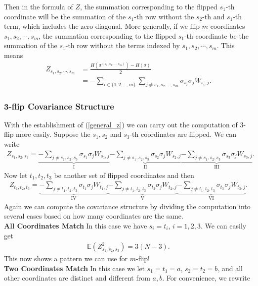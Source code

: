 \documentclass[10pt]{article}
\newcommand{\e}{\mathbb{E}}
\newenvironment{Proof of lemma}{\noindent{\bf Proof of Lemma}}{\hfill$\Box$\newline}
\newenvironment{Proof of claim}{\noindent{\bf Proof of claim}}{\hfill$\Box$\newline}
\newenvironment{Proof of theorem}{\noindent{\bf Proof of Theorem}}{\hfill\scriptsize{$\Box$}\newline}
\newenvironment{Proof of theorems}{\noindent{\bf Proof of Theorems}}{\hfill$\Box$\newline}
\newenvironment{Proof of proposition}{\noindent{\bf Proof of Proposition}}{\hfill$\Box$\newline}
\newenvironment{Proof of propositions}{\noindent{\bf Proof of Propositions}}{\hfill$\Box$\newline}
\newenvironment{Proof of exercise}{\noindent{\it Proof of Exercise:}}{\hfill$\Box$}
\numberwithin{equation}{section}
\begin{document}
Then in the formula of $Z$, the summation corresponding to the flipped $s_1$-th coordinate will be the summation of the $s_1$-th row without the $s_2$-th and $s_1$-th term, which includes the zero diagonal. More generally, if we flip $m$ coordinates ${s_1,s_2,\cdots,s_m}$, the summation corresponding to the flipped $s_1$-th coordinate be the summation of the $s_1$-th row without the terms indexed by ${s_1,s_2,\cdots,s_m}$. This means
\begin{align} \label{general_z}
    Z_{s_1,s_2,\cdots,s_m} &= \frac{H(\sigma^{(s_1,s_2,\cdots,s_m)})-H(\sigma)}{2} \nonumber \\
    &= -\sum_{i \in \{1,2,\cdots,m\}} \sum_{j \neq s_1,s_2,\cdots,s_m} \sigma_{s_i} \sigma_j W_{s_i,j}.
\end{align}
\subsubsection{3-flip Covariance Structure}
With the establishment of (\ref{general_z}) we can carry out the computation of 3-flip more easily. Suppose the $s_1,s_2$ and $s_3$-th coordinates are flipped. We can write
\begin{align}
    Z_{s_1,s_2,s_3} = \underbrace{- \sum_{j \neq s_1,s_2,s_3} \sigma_{s_1} \sigma_j W_{s_1,j}}_\text{I} \underbrace{- \sum_{j \neq s_1,s_2,s_3} \sigma_{s_2} \sigma_j W_{s_2,j}}_\text{II} \underbrace{- \sum_{j \neq s_1,s_2,s_3} \sigma_{s_3} \sigma_j W_{s_3,j}}_\text{III}.
\end{align}
Now let $t_1,t_2,t_3$ be another set of flipped coordinates and then
\begin{align}
    Z_{t_1,t_2,t_3} = \underbrace{- \sum_{j \neq t_1,t_2,t_3} \sigma_{t_1} \sigma_j W_{t_1,j}}_\text{IV} \underbrace{- \sum_{j \neq t_1,t_2,t_3} \sigma_{t_2} \sigma_j W_{t_2,j}}_\text{V} \underbrace{- \sum_{j \neq t_1,t_2,t_3} \sigma_{t_3} \sigma_j W_{t_3,j}}_\text{VI}.
\end{align}
Again we can compute the covariance structure by dividing the computation into several cases based on how many coordinates are the same.\\
\textbf{All Coordinates Match} In this case we have $s_i = t_i$, $i=1,2,3$. We can easily get
\begin{align}
    \e(Z_{s_1,s_2,s_3}^2) = 3(N-3).
\end{align}
This now shows a pattern we can use for $m$-flip!\\
\textbf{Two Coordinates Match} In this case we let $s_1 = t_1 =a$, $s_2 = t_2 =b$, and all other coordinates are distinct and different from $a,b$. For convenience, we rewrite
\end{document}
